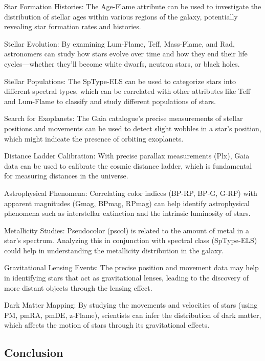 Star Formation Histories: The Age-Flame attribute can be used to investigate the distribution of stellar ages within various regions of the galaxy, potentially revealing star formation rates and histories.

Stellar Evolution: By examining Lum-Flame, Teff, Mass-Flame, and Rad, astronomers can study how stars evolve over time and how they end their life cycles—whether they'll become white dwarfs, neutron stars, or black holes.

Stellar Populations: The SpType-ELS can be used to categorize stars into different spectral types, which can be correlated with other attributes like Teff and Lum-Flame to classify and study different populations of stars.

Search for Exoplanets: The Gaia catalogue's precise measurements of stellar positions and movements can be used to detect slight wobbles in a star’s position, which might indicate the presence of orbiting exoplanets.

Distance Ladder Calibration: With precise parallax measurements (Plx), Gaia data can be used to calibrate the cosmic distance ladder, which is fundamental for measuring distances in the universe.

Astrophysical Phenomena: Correlating color indices (BP-RP, BP-G, G-RP) with apparent magnitudes (Gmag, BPmag, RPmag) can help identify astrophysical phenomena such as interstellar extinction and the intrinsic luminosity of stars.

Metallicity Studies: Pseudocolor (pscol) is related to the amount of metal in a star's spectrum. Analyzing this in conjunction with spectral class (SpType-ELS) could help in understanding the metallicity distribution in the galaxy.

Gravitational Lensing Events: The precise position and movement data may help in identifying stars that act as gravitational lenses, leading to the discovery of more distant objects through the lensing effect.

Dark Matter Mapping: By studying the movements and velocities of stars (using PM, pmRA, pmDE, z-Flame), scientists can infer the distribution of dark matter, which affects the motion of stars through its gravitational effects.




\subsection{Conclusion}

